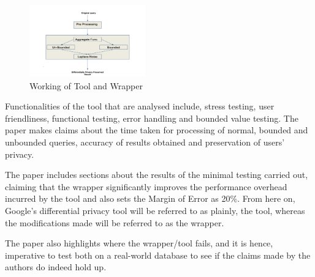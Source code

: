\documentclass[acmsmall]{acmart}
\begin{document}
\begin{figure}[htp]
    \centering
    \includegraphics[width=5cm]{Fig 2.3.1.png}
    \caption{Working of Tool and Wrapper}
    \label{fig:2.3.1}
\end{figure}

Functionalities of the tool that are analysed include, stress testing, user friendliness, functional testing, error handling and bounded value testing. The paper makes claims about the time taken for processing of normal, bounded and unbounded queries, accuracy of results obtained and preservation of users' privacy. 

The paper includes sections about the results of the minimal testing carried out, claiming that the wrapper significantly improves the performance overhead incurred by the tool and also sets the Margin of Error as 20\%. From here on, Google's differential privacy tool will be referred to as plainly, the tool, whereas the modifications made will be referred to as the wrapper. 

The paper also highlights where the wrapper/tool fails, and it is hence, imperative to test both on a real-world database to see if the claims made by the authors do indeed hold up. 
\end{document}
